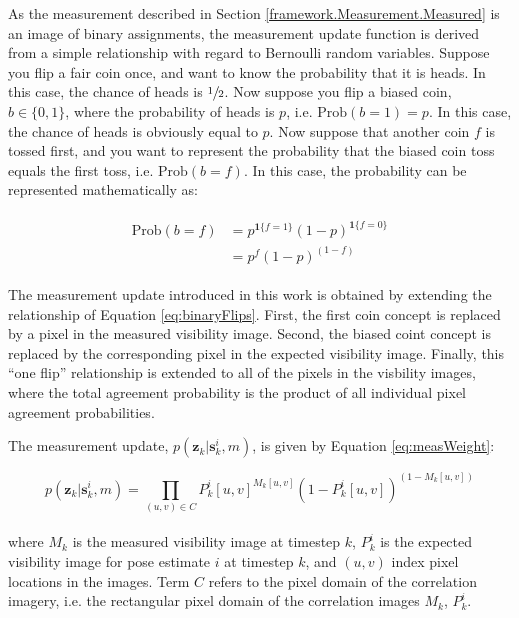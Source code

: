 As the measurement described in Section \ref{framework.Measurement.Measured} is an image of binary assignments, the measurement update function is derived from a simple relationship with regard to Bernoulli random variables.  Suppose you flip a fair coin once, and want to know the probability that it is heads.  In this case, the chance of heads is $\sfrac{1}{2}$. Now suppose you flip a biased coin, $b \in \{0,1\}$, where the probability of heads is $p$, i.e. $\text{Prob}(b = 1) = p$. In this case, the chance of heads is obviously equal to $p$. Now suppose that another coin $f$ is tossed first, and you want to represent the probability that the biased coin toss equals the first toss, i.e. $\text{Prob}(b=f)$.  In this case, the probability can be represented mathematically as:

\begin{align}
\begin{split}
\text{Prob}(b=f) &= p^{\mathbf{1}\{f=1\}} (1 - p)^{\mathbf{1}\{f=0\}} \\
&= p^{f}(1-p)^{(1-f)}
\end{split}
\label{eq:binaryFlips}
\end{align}

The measurement update introduced in this work is obtained by extending the relationship of Equation \ref{eq:binaryFlips}.
First, the first coin concept is replaced by a pixel in the measured visibility image.
Second, the biased coint concept is replaced by the corresponding pixel in the expected visibility image.
Finally, this ``one flip'' relationship is extended to all of the pixels in the visbility images, where the total agreement probability is the product of all individual pixel agreement probabilities.

The measurement update, $p(\mathbf{z}_k | \mathbf{s}_k^{i}, m)$, is given by Equation \ref{eq:measWeight}:

\large
\begin{equation}
p(\mathbf{z}_k | \mathbf{s}_k^{i}, m)  = \prod_{(u,v) \in C} P_k^{i}[u,v]^{M_k[u,v]} (1 - P_k^{i}[u,v])^{(1 - M_k[u,v])}
\label{eq:measWeight}
\end{equation}
\normalsize
\\
\noindent where $M_k$ is the measured visibility image at timestep $k$, $P_k^{i}$ is the expected visibility image for pose estimate $i$ at timestep $k$, and $(u,v)$ index pixel locations in the images.
Term $C$ refers to the pixel domain of the correlation imagery, i.e. the rectangular pixel domain of the correlation images $M_k$, $P_k^{i}$.

